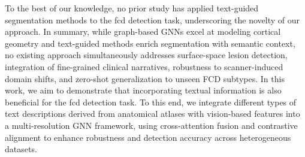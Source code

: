 \documentclass[FCD_GNN.tex]{subfiles}
\begin{document}
To the best of our knowledge, no prior study has applied text-guided segmentation methods to the \ac{fcd} detection 
task, underscoring the novelty of our approach. In summary, while graph-based GNNs excel at modeling cortical 
geometry and text-guided methods enrich segmentation with semantic context, no existing approach simultaneously 
addresses surface-space lesion detection, integration of fine-grained clinical narratives, robustness to scanner-induced 
domain shifts, and zero-shot generalization to unseen FCD subtypes. In this work, we aim to demonstrate that incorporating 
textual information is also beneficial for the \ac{fcd} detection task. To this end, we integrate different types of text 
descriptions derived from anatomical atlases with vision-based features into a multi-resolution GNN framework, using 
cross-attention fusion and contrastive alignment to enhance robustness and detection accuracy across heterogeneous datasets.
\end{document}
